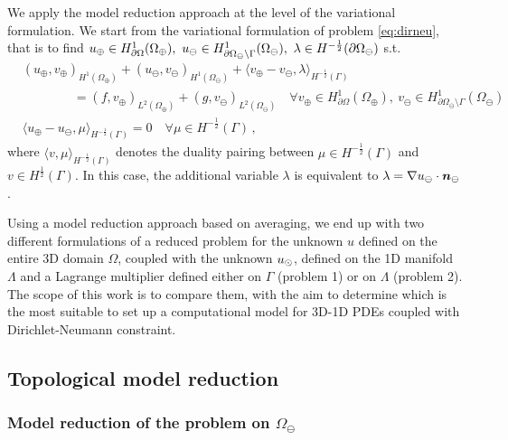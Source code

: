\documentclass[r]{siamart171218}
\begin{document}
We apply the model reduction approach at the level of the variational formulation.
We start from the variational formulation of problem \eqref{eq:dirneu}, 
that is to find $\up \in H^1_{\partial\Omega}(\Omega_\oplus), \ \uf \in H^1_{\partial\Omega_\ominus\setminus\Gamma}(\Omega_\ominus), \ \lambda \in H^{-\frac12}(\partial\Omega_\ominus)$ s.t.
\begin{subequations}\label{eq:weak_dirneu}
\begin{align}
&(u_\oplus,v_\oplus)_{H^1(\Omega_\oplus)} + (u_\ominus,v_\ominus)_{H^1(\Omega_\ominus)} 
+ \langle  v_\oplus - v_\ominus, \lambda \rangle_{H^{-\frac12}(\Gamma)} 
\\
\nonumber
&\qquad\qquad = (f,v_\oplus)_{L^2(\Omega_\oplus)} + (g,v_\ominus)_{L^2(\Omega_\ominus)}
\quad \forall v_\oplus \in H^1_{\partial\Omega}(\Omega_\oplus), \ v_\ominus \in H^1_{\partial\Omega_\ominus\setminus\Gamma}(\Omega_\ominus)
\\
& \langle u_\oplus - u_\ominus, \mu \rangle_{H^{-\frac12}(\Gamma)} = 0
\quad \forall  \mu \in H^{-\frac12}(\Gamma)\,,
\end{align}
\end{subequations}
where $\langle v, \mu \rangle_{H^{-\frac12}(\Gamma)}$ denotes the duality pairing between 
$ \mu \in H^{-\frac12}(\Gamma)$ and $v \in H^{\frac12}(\Gamma)$.
In this case, the additional variable $\lambda$ is equivalent to $\lambda  =  \nabla u_{\ominus} \cdot \boldsymbol n_\ominus$.

Using a model reduction approach based on averaging, we end up with two different formulations of a reduced problem
for the unknown $u$ defined on the entire 3D domain $\Omega$, coupled with the unknown $u_{\odot}$, defined on the 1D manifold $\Lambda$
and a Lagrange multiplier defined either on $\Gamma$ (problem 1) or on $\Lambda$ (problem 2). 
The scope of this work is to compare them, with the aim to determine which is the most suitable to set up a computational model for 3D-1D PDEs coupled with Dirichlet-Neumann constraint.


\subsection{Topological model reduction}
\subsubsection*{Model reduction of the problem on $\Omega_{\ominus}$}
\end{document}
